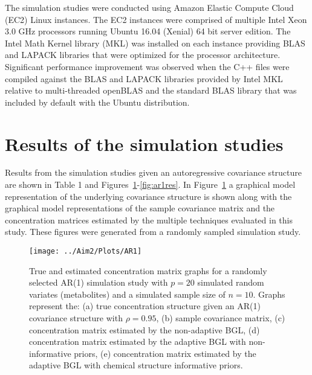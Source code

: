 \begin{DoubleSpace}
The simulation studies were conducted using Amazon Elastic Compute Cloud (EC2) Linux instances. The EC2 instances were comprised of multiple Intel Xeon 3.0 GHz processors running Ubuntu 16.04 (Xenial) 64 bit server edition. The Intel Math Kernel library (MKL) was installed on each instance providing BLAS and LAPACK libraries that were optimized for the processor architecture. Significant performance improvement was observed when the C++ files were compiled against the BLAS and LAPACK libraries provided by Intel MKL relative to multi-threaded openBLAS and the standard BLAS library that was included by default with the Ubuntu distribution. 

\section{Results of the simulation studies}
Results from the simulation studies given an autoregressive covariance structure are shown in Table 1 and Figures~\ref{fig:ar1}-\ref{fig:ar1res}. In Figure~\ref{fig:ar1} a graphical model representation of the underlying covariance structure is shown along with the graphical model representations of the sample covariance matrix and the concentration matrices estimated by the multiple techniques evaluated in this study. These figures were generated from a randomly sampled simulation study. 
\end{DoubleSpace}

\newpage
{}
\recalctypearea
\begin{figure}[H]
\texttt{[image: ../Aim2/Plots/AR1]}
	\caption[Graphical models from a randomly selected AR(1) simulation study]{\DoubleSpacing True and estimated concentration matrix graphs for a randomly selected AR(1) simulation study with $p=20$ simulated random variates (metabolites) and a simulated sample size of $n=10$. Graphs represent the: (a) true concentration structure given an AR(1) covariance structure with $\rho=0.95$, (b) sample covariance matrix, (c) concentration matrix estimated by the non-adaptive BGL, (d) concentration matrix estimated by the adaptive BGL with non-informative priors, (e) concentration matrix estimated by the adaptive BGL with chemical structure informative priors.  \label{fig:ar1} }
\end{figure}
\newpage
{}
\recalctypearea

